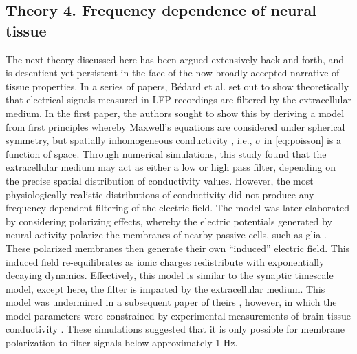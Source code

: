 \subsection{Theory 4. Frequency dependence of neural tissue} \label{sec:filter_theory}
The next theory discussed here has been argued extensively back and forth, and is desentient yet persistent in the face of the now broadly accepted narrative of tissue properties. In a series of papers, Bédard et al.\cite{Bedard2004, Bedard2006a, Bedard2009} set out to show theoretically that electrical signals measured in LFP recordings are filtered by the extracellular medium. In the first paper, the authors sought to show this by deriving a model from first principles whereby Maxwell’s equations are considered under spherical symmetry, but spatially inhomogeneous conductivity \cite{Bedard2004}, i.e., $\sigma$ in \ref{eq:poisson} is a function of space. Through numerical simulations, this study found that the extracellular medium may act as either a low or high pass filter, depending on the precise spatial distribution of conductivity values. However, the most physiologically realistic distributions of conductivity did not produce any frequency-dependent filtering of the electric field. The model was later elaborated by considering polarizing effects, whereby the electric potentials generated by neural activity polarize the membranes of nearby passive cells, such as glia \cite{Bedard2006a}. These polarized membranes then generate their own ``induced'' electric field. This induced field re-equilibrates as ionic charges redistribute with exponentially decaying dynamics. Effectively, this model is similar to the synaptic timescale model, except here, the filter is imparted by the extracellular medium. This model was undermined in a subsequent paper of theirs \cite{Bedard2009}, however, in which the model parameters were constrained by experimental measurements of brain tissue conductivity \cite{Gabriel1996}. These simulations suggested that it is only possible for membrane polarization to filter signals below approximately 1 Hz.

